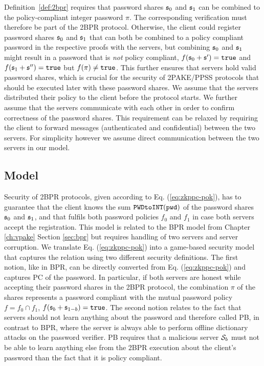\noindent
Definition~\ref{def:2bpr} requires that password shares $\mathfrak{s}_0$ and $\mathfrak{s}_1$ can be combined to the policy-compliant integer password $\pi$. The corresponding verification must therefore be part of the \ac{2BPR} protocol. 
Otherwise, the client could register password shares $\mathfrak{s}_0$ and $\mathfrak{s}_1$ that can both be combined to a policy compliant password in the respective proofs with the servers, but combining $\mathfrak{s}_0$ and $\mathfrak{s}_1$ might result in a password that is \emph{not} policy compliant, \ie $f(\mathfrak{s}_0+\mathfrak{s}')=\mathtt{true}$ and $f(\mathfrak{s}_1+\mathfrak{s}'')=\mathtt{true}$ but $f(\pi)\not=\mathtt{true}$.
This further ensures that servers hold valid password shares, which is crucial for the security of \ac{2PAKE}/\ac{PPSS} protocols that should be executed later with these password shares.
We assume that the servers distributed their policy to the client before the protocol starts.
We further assume that the servers communicate with each other in order to confirm correctness of the password shares.
This requirement can be relaxed by requiring the client to forward messages (authenticated and confidential) between the two servers.
For simplicity however we assume direct communication between the two servers in our model.


\subsection{Model}\label{sec:securitymodel}
Security of \ac{2BPR} protocols, given according to Eq. (\ref{eq:zkppc-pok}), has to guarantee that the client knows the sum $\texttt{PWDtoINT}(\mathtt{pwd})$ of the password shares $\mathfrak{s}_0$ and $\mathfrak{s}_1$, and that \pwd fulfils both password policies $f_0$ and $f_1$ in case both servers accept the registration.
This model is related to the \ac{BPR} model from Chapter \ref{ch:vpake} Section \ref{sec:bpr} but requires handling of two servers and server corruption.
We translate Eq. (\ref{eq:zkppc-pok}) into a game-based security model that captures the relation using two different security definitions.
The first notion, like in \ac{BPR}, can be directly converted from Eq. (\ref{eq:zkppc-pok}) and captures \acl{PC} of the password.
In particular, if both servers are honest while accepting their password shares in the \ac{2BPR} protocol, the combination $\pi$ of the shares represents a password compliant with the mutual password policy $f=f_0\cap f_1$, \ie $f(\mathfrak{s}_b+\mathfrak{s}_{1-b})=\mathtt{true}$.
The second notion relates to the fact that servers should not learn anything about the password and therefore called \ac{PB}, in contrast to \ac{BPR}, where the server is always able to perform offline dictionary attacks on the password verifier.
\ac{PB} requires that a malicious server $\mathcal{S}_b$ must not be able to learn anything else from the \ac{2BPR} execution about the client's password than the fact that it is policy compliant.

